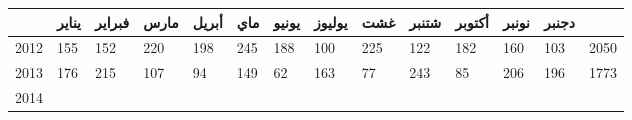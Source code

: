 \documentclass[11pt,a4paper]{article}
\begin{document}
\begin{table}[h!]

\begin{tabular} { llllllllllllll }
 \hline

\rowcolor[HTML]{ EFEFEF }
\textbf{  }

& \textbf{\textarabic{ يناير }}

& \textbf{\textarabic{ فبراير }}

& \textbf{\textarabic{ مارس }}

& \textbf{\textarabic{ أبريل }}

& \textbf{\textarabic{ ماي }}

& \textbf{\textarabic{ يونيو }}

& \textbf{\textarabic{ يوليوز }}

& \textbf{\textarabic{ غشت }}

& \textbf{\textarabic{ شتنبر }}

& \textbf{\textarabic{ أكتوبر }}

& \textbf{\textarabic{ نونبر }}

& \textbf{\textarabic{ دجنبر }}

& \textbf{  }
 \\  \hline

 2012 &

\cellcolor[HTML]{ E9F949 } 155
 & \cellcolor[HTML]{ E9F949 } 152  & \cellcolor[HTML]{ FA8C21 } 220  & \cellcolor[HTML]{ FA8C21 } 198  & \cellcolor[HTML]{ F2413D } 245  & \cellcolor[HTML]{ FFD62B } 188  & \cellcolor[HTML]{ 62B0C3 } 100  & \cellcolor[HTML]{ F2413D } 225  & \cellcolor[HTML]{ 77E16A } 122  & \cellcolor[HTML]{ FFD62B } 182  & \cellcolor[HTML]{ E9F949 } 160  & \cellcolor[HTML]{ 62B0C3 } 103

 & 2050

\\  \hline

 2013 &

\cellcolor[HTML]{ FFD62B } 176
 & \cellcolor[HTML]{ FA8C21 } 215  & \cellcolor[HTML]{ 62B0C3 } 107  & \cellcolor[HTML]{ 62B0C3 } 94  & \cellcolor[HTML]{ E9F949 } 149  & \cellcolor[HTML]{ 3A52bA } 62  & \cellcolor[HTML]{ E9F949 } 163  & \cellcolor[HTML]{ 3A52bA } 77  & \cellcolor[HTML]{ F2413D } 243  & \cellcolor[HTML]{ 3A52bA } 85  & \cellcolor[HTML]{ FA8C21 } 206  & \cellcolor[HTML]{ FA8C21 } 196

 & 1773

\\  \hline

 2014 &


\end{tabular}
\end{table}
\end{document}
